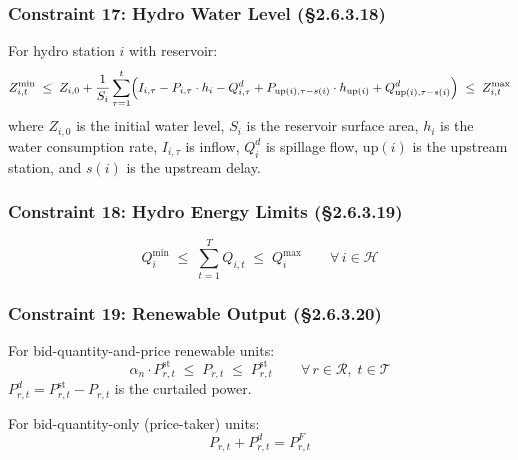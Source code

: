 \subsubsection{Constraint 17: Hydro Water Level (§2.6.3.18)}\label{sec:scuc-hydro-wl}

For hydro station $i$ with reservoir:
\begin{equation}\label{eq:hydro-wl}
  Z^{\min}_{i,t}
  \;\leq\;
  Z_{i,0} + \frac{1}{S_i}\sum_{\tau=1}^{t}
  \Bigl(I_{i,\tau} - P_{i,\tau} \cdot h_i - Q^{d}_{i,\tau}
  + P_{\mathrm{up}(i),\tau-s(i)} \cdot h_{\mathrm{up}(i)}
  + Q^{d}_{\mathrm{up}(i),\tau-s(i)}\Bigr)
  \;\leq\;
  Z^{\max}_{i,t}
\end{equation}
where $Z_{i,0}$ is the initial water level, $S_i$ is the reservoir surface
area, $h_i$ is the water consumption rate, $I_{i,\tau}$ is inflow, $Q^{d}_{i}$
is spillage flow, $\mathrm{up}(i)$ is the upstream station, and $s(i)$ is the
upstream delay.

\subsubsection{Constraint 18: Hydro Energy Limits (§2.6.3.19)}\label{sec:scuc-hydro-energy}

\begin{equation}\label{eq:hydro-energy}
  Q^{\min}_i \;\leq\;
  \sum_{t=1}^{T} Q_{i,t}
  \;\leq\; Q^{\max}_i
  \qquad \forall\, i \in \mathcal{H}
\end{equation}

\subsubsection{Constraint 19: Renewable Output (§2.6.3.20)}\label{sec:scuc-renewable}

For bid-quantity-and-price renewable units:
\begin{equation}\label{eq:re-bounds}
  \alpha_n \cdot P^{\mathrm{st}}_{r,t}
  \;\leq\;
  P_{r,t}
  \;\leq\;
  P^{\mathrm{st}}_{r,t}
  \qquad \forall\, r \in \mathcal{R},\; t \in \mathcal{T}
\end{equation}
$P^{d}_{r,t} = P^{\mathrm{st}}_{r,t} - P_{r,t}$ is the curtailed power.

For bid-quantity-only (price-taker) units:
\begin{equation}\label{eq:re-price-taker}
  P_{r,t} + P^{d}_{r,t} = P^{F}_{r,t}
\end{equation}

